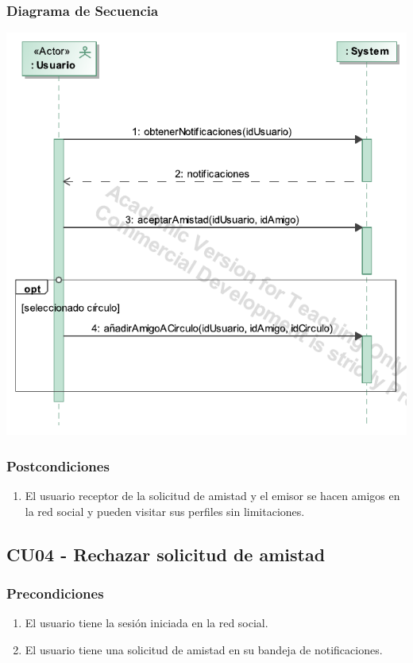 \documentclass[12pt, a4paper, titlepage]{article}
\begin{document}
\subsubsection{Diagrama de Secuencia}
\begin{center}
	\includegraphics[width=\textwidth]{Imagenes/Aceptar_solicitud_de_amistad}
\end{center}

\subsubsection{Postcondiciones}
\begin{enumerate}
	\item El usuario receptor de la solicitud de amistad y el emisor se hacen amigos en la red social y pueden visitar sus perfiles sin limitaciones.
\end{enumerate}


\subsection{CU04 - Rechazar solicitud de amistad}

\subsubsection{Precondiciones}
\begin{enumerate}
	\item El usuario tiene la sesión iniciada en la red social.
	\item El usuario tiene una solicitud de amistad en su bandeja de notificaciones.
\end{enumerate}
\end{document}

